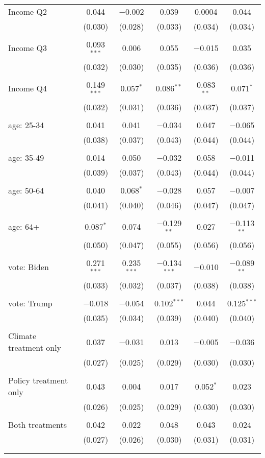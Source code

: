 \begin{tabular}{@{\extracolsep{5pt}}lccccc}
 Income Q2 & 0.044 & $-$0.002 & 0.039 & 0.0004 & 0.044 \\ 
  & (0.030) & (0.028) & (0.033) & (0.034) & (0.034) \\ 
  & & & & & \\ 
 Income Q3 & 0.093$^{***}$ & 0.006 & 0.055 & $-$0.015 & 0.035 \\ 
  & (0.032) & (0.030) & (0.035) & (0.036) & (0.036) \\ 
  & & & & & \\ 
 Income Q4 & 0.149$^{***}$ & 0.057$^{*}$ & 0.086$^{**}$ & 0.083$^{**}$ & 0.071$^{*}$ \\ 
  & (0.032) & (0.031) & (0.036) & (0.037) & (0.037) \\ 
  & & & & & \\ 
 age: 25-34 & 0.041 & 0.041 & $-$0.034 & 0.047 & $-$0.065 \\ 
  & (0.038) & (0.037) & (0.043) & (0.044) & (0.044) \\ 
  & & & & & \\ 
 age: 35-49 & 0.014 & 0.050 & $-$0.032 & 0.058 & $-$0.011 \\ 
  & (0.039) & (0.037) & (0.043) & (0.044) & (0.044) \\ 
  & & & & & \\ 
 age: 50-64 & 0.040 & 0.068$^{*}$ & $-$0.028 & 0.057 & $-$0.007 \\ 
  & (0.041) & (0.040) & (0.046) & (0.047) & (0.047) \\ 
  & & & & & \\ 
 age: 64+ & 0.087$^{*}$ & 0.074 & $-$0.129$^{**}$ & 0.027 & $-$0.113$^{**}$ \\ 
  & (0.050) & (0.047) & (0.055) & (0.056) & (0.056) \\ 
  & & & & & \\ 
 vote: Biden & 0.271$^{***}$ & 0.235$^{***}$ & $-$0.134$^{***}$ & $-$0.010 & $-$0.089$^{**}$ \\ 
  & (0.033) & (0.032) & (0.037) & (0.038) & (0.038) \\ 
  & & & & & \\ 
 vote: Trump & $-$0.018 & $-$0.054 & 0.102$^{***}$ & 0.044 & 0.125$^{***}$ \\ 
  & (0.035) & (0.034) & (0.039) & (0.040) & (0.040) \\ 
  & & & & & \\ 
 Climate treatment only & 0.037 & $-$0.031 & 0.013 & $-$0.005 & $-$0.036 \\ 
  & (0.027) & (0.025) & (0.029) & (0.030) & (0.030) \\ 
  & & & & & \\ 
 Policy treatment only & 0.043 & 0.004 & 0.017 & 0.052$^{*}$ & 0.023 \\ 
  & (0.026) & (0.025) & (0.029) & (0.030) & (0.030) \\ 
  & & & & & \\ 
 Both treatments & 0.042 & 0.022 & 0.048 & 0.043 & 0.024 \\ 
  & (0.027) & (0.026) & (0.030) & (0.031) & (0.031) \\ 
  & & & & & \\ 
\hline \\[-1.8ex] 


\end{tabular}
